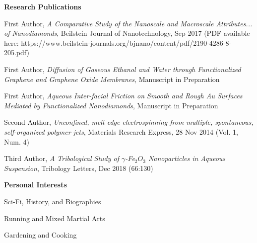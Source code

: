 \documentclass[letterpaper,final]{memoir}
\newcommand{\Sep}{\vspace{1.0em}}
\newcommand{\SmallSep}{\vspace{0.4em}}
\newcommand{\CVSection}[1]
	{\LARGE\textbf{#1}\par
	\SmallSep\normalsize}
\begin{document}

\notoserif \CVSection{Research Publications}
\normalfont

\SmallSep

\begin{compactitem}[\color{Blue}$\circ$]
	 
    \item First Author, \textit{A Comparative Study of the Nanoscale and Macroscale Attributes... of Nanodiamonds}, Beilstein Journal of Nanotechnology, Sep 2017 (PDF available here: https://www.beilstein-journals.org/bjnano/content/pdf/2190-4286-8-205.pdf)
    \SmallSep

    \item First Author, \textit{Diffusion of Gaseous Ethanol and Water through Functionalized Graphene and Graphene Oxide Membranes}, Manuscript in Preparation
    \SmallSep

    \item First Author, \textit{Aqueous Inter-facial Friction on Smooth and Rough Au Surfaces Mediated by Functionalized Nanodiamonds}, Manuscript in Preparation
    \SmallSep
    
    \item Second Author, \textit{Unconfined, melt edge electrospinning from multiple, spontaneous, self-organized polymer jets}, Materials Research Express, 28 Nov 2014 (Vol. 1, Num. 4)
    \SmallSep

    \item Third Author, \textit{A Tribological Study of $\gamma$-Fe$_{2}O_{3}$ Nanoparticles in Aqueous Suspension}, Tribology Letters, Dec 2018 (66:130)
	
\end{compactitem}

\Sep
\notoserif \CVSection{Personal Interests}
\normalfont

\begin{multicols}{3}
	\begin{compactitem}
		
		\item Sci-Fi, History, and Biographies
		\item Running and Mixed Martial Arts
        \item Gardening and Cooking
			
	\end{compactitem}
\end{multicols}
\end{document}
